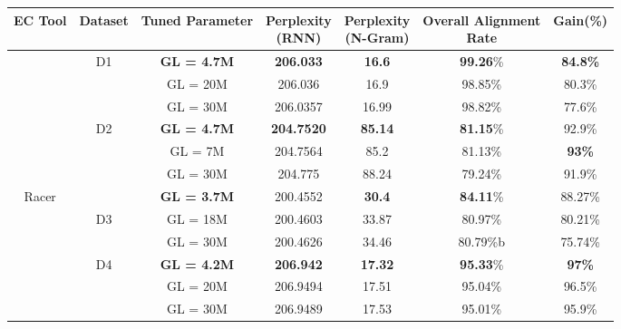 \begin{table}
\centering
\small
\begin{tabular}{ |c|c|c|c|c|c|c| } 
\hline
EC Tool & {Dataset} & Tuned Parameter & \makecell{Perplexity\\(RNN)} & \makecell{Perplexity\\(N-Gram)} & \makecell{Overall Alignment\\ Rate} & Gain(\%) \\ 
 \hline
 						 & D1 & \textbf{GL = 4.7M} & \textbf{206.033} & \textbf{16.6} & \textbf{99.26}\% & \textbf{84.8\%} 
 \\ 						  
						 &  & GL = 20M & 206.036 & 16.9 &  98.85\% &  80.3\% \\ 
 						 &  & GL = 30M & 206.0357 & 16.99 & 98.82\% & 77.6\%
 \\\cline{2-7}
  						 & D2 & \textbf{GL = 4.7M} & \textbf{204.7520} & \textbf{85.14}  & \textbf{81.15}\% & 92.9\% \\
                         &  & GL = 7M & 204.7564 & 85.2  & 81.13\% & \textbf{93\%}\\
                         &  & GL = 30M & 204.775 & 88.24  & 79.24\% & 91.9\%
  \\\cline{2-7}                       
               \multirow{4}{*}{Racer}          &  & \textbf{GL = 3.7M} & 200.4552 & \textbf{30.4}  & \textbf{84.11}\% & 88.27\% \\                                               
                         & D3 & GL = 18M & 200.4603 & 33.87 & 80.97\% & 80.21\% \\
                         &  & GL = 30M & 200.4626 & 34.46  & 80.79\%b & 75.74\%
  \\\cline{2-7}                       
                         & D4 & \textbf{GL = 4.2M} & \textbf{206.942} & \textbf{17.32} & \textbf{95.33}\% & \textbf{97\%} \\
                         &  & GL = 20M & 206.9494 & 17.51 & 95.04\% & 96.5\% \\
                         &  & GL = 30M & 206.9489 & 17.53 & 95.01\% & 95.9\%
  \\\cline{2-7}                       
                         

\end{tabular}
\end{table}
